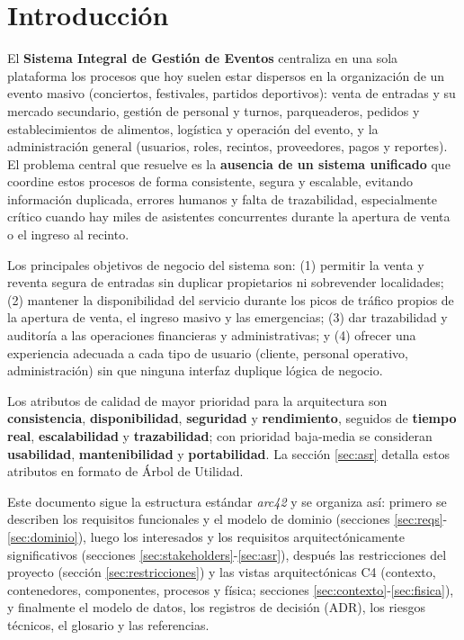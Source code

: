 \documentclass[11pt,a4paper]{article}
\begin{document}
\section{Introducción}

El \textbf{Sistema Integral de Gestión de Eventos} centraliza en una sola plataforma los procesos
que hoy suelen estar dispersos en la organización de un evento masivo (conciertos, festivales,
partidos deportivos): venta de entradas y su mercado secundario, gestión de personal y turnos,
parqueaderos, pedidos y establecimientos de alimentos, logística y operación del evento, y la
administración general (usuarios, roles, recintos, proveedores, pagos y reportes). El problema
central que resuelve es la \textbf{ausencia de un sistema unificado} que coordine estos procesos
de forma consistente, segura y escalable, evitando información duplicada, errores humanos y falta
de trazabilidad, especialmente crítico cuando hay miles de asistentes concurrentes durante la
apertura de venta o el ingreso al recinto.

Los principales objetivos de negocio del sistema son: (1) permitir la venta y reventa segura de
entradas sin duplicar propietarios ni sobrevender localidades; (2) mantener la disponibilidad del
servicio durante los picos de tráfico propios de la apertura de venta, el ingreso masivo y las
emergencias; (3) dar trazabilidad y auditoría a las operaciones financieras y administrativas; y
(4) ofrecer una experiencia adecuada a cada tipo de usuario (cliente, personal operativo,
administración) sin que ninguna interfaz duplique lógica de negocio.

Los atributos de calidad de mayor prioridad para la arquitectura son \textbf{consistencia},
\textbf{disponibilidad}, \textbf{seguridad} y \textbf{rendimiento}, seguidos de \textbf{tiempo
real}, \textbf{escalabilidad} y \textbf{trazabilidad}; con prioridad baja-media se consideran
\textbf{usabilidad}, \textbf{mantenibilidad} y \textbf{portabilidad}. La sección
\ref{sec:asr} detalla estos atributos en formato de Árbol de Utilidad.

Este documento sigue la estructura estándar \textit{arc42} y se organiza así: primero se describen
los requisitos funcionales y el modelo de dominio (secciones \ref{sec:reqs}-\ref{sec:dominio}),
luego los interesados y los requisitos arquitectónicamente significativos (secciones
\ref{sec:stakeholders}-\ref{sec:asr}), después las restricciones del proyecto (sección
\ref{sec:restricciones}) y las vistas arquitectónicas C4 (contexto, contenedores, componentes,
procesos y física; secciones \ref{sec:contexto}-\ref{sec:fisica}), y finalmente el modelo de
datos, los registros de decisión (ADR), los riesgos técnicos, el glosario y las referencias.
\end{document}
